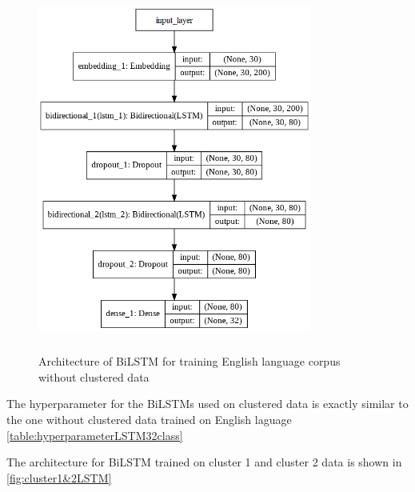 \begin{figure}[!ht]
    \centering
    \includegraphics[width=9cm, height=12cm]{pics/EN_32.png}
    \captionsetup{justification=centering,margin=2cm}
    \caption{Architecture of \gls{BiLSTM} for training English language corpus without clustered data}
    \label{fig:PlainLSTM}
\end{figure}
\clearpage
The hyperparameter for the \glspl{BiLSTM} used on clustered data is exactly similar to the one without clustered data trained on English laguage \ref{table:hyperparameterLSTM32class}

The architecture for \gls{BiLSTM} trained on cluster 1 and cluster 2 data is shown in \ref{fig:cluster1&2LSTM}



